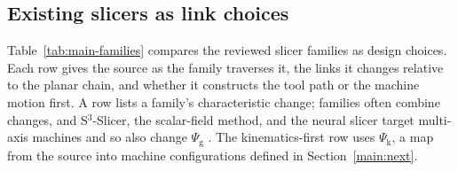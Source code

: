 \subsection{Existing slicers as link choices}
\label{main:families}
Table~\ref{tab:main-families} compares the reviewed slicer families as design choices. Each row gives the source as the family traverses it, the links it changes relative to the planar chain, and whether it constructs the tool path or the machine motion first. A row lists a family's characteristic change; families often combine changes, and S$^3$-Slicer, the scalar-field method, and the neural slicer target multi-axis machines and so also change $\Psi_{\mathrm{g}}$ \cite{zhang2022s3,dai2018support,liu2024neural}. The kinematics-first row uses $\Psi_{\mathrm{k}}$, a map from the source into machine configurations defined in Section~\ref{main:next}.

